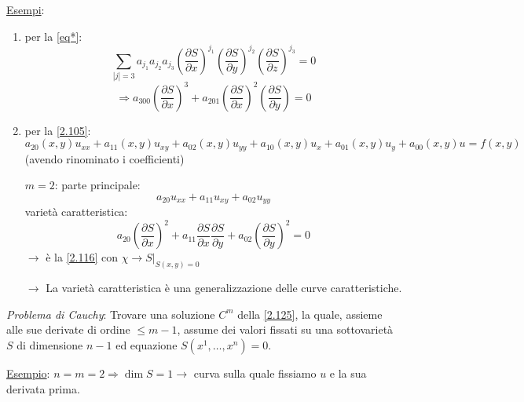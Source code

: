 \documentclass[a4paper,11pt]{report}
\begin{document}
\underline{Esempi}:
\begin{enumerate}[label=(\roman*)]
\item per la \eqref{eq*}: 
\[
\sum_{|j| = 3}a_{j_1} a_{j_2} a_{j_3}\left(\frac{\partial S}{\partial x}\right)^{j_1}\left(\frac{\partial S}{\partial y}\right)^{j_2}\left(\frac{\partial S}{\partial z}\right)^{j_3}=0
\]
\[
\Rightarrow a_{300}\left(\frac{\partial S}{\partial x}\right)^3 + a_{201}\left(\frac{\partial S}{\partial x}\right)^2\left(\frac{\partial S}{\partial y}\right)=0
\]
\item per la \eqref{2.105}:
\[
a_{20}(x,y)u_{xx}+a_{11}(x,y)u_{xy} + a_{02}(x,y)u_{yy} + a_{10}(x,y)u_x + a_{01}(x,y)u_y + a_{00}(x,y)u = f(x,y)
\]
(avendo rinominato i coefficienti)

$m=2$: parte principale:
\[
a_{20}u_{xx} + a_{11}u_{xy} + a_{02}u_{yy}
\]
variet\`a caratteristica:
\[
a_{20}\left(\frac{\partial S}{\partial x}\right)^2 + a_{11}\frac{\partial S}{\partial x}\frac{\partial S}{\partial y} + a_{02}\left(\frac{\partial S}{\partial y}\right)^2=0
\]
$\rightarrow$ \`e la \eqref{2.116} con $\chi \rightarrow S|_{S(x,y)=0}$

$\rightarrow$ La variet\`a caratteristica \`e una generalizzazione delle curve caratteristiche.
\end{enumerate}

\emph{Problema di Cauchy}: Trovare una soluzione $C^m$ della \eqref{2.125}, la quale, assieme alle sue derivate di ordine $\leq m-1$, assume dei valori fissati su una sottovariet\`a $S$ di dimensione $n-1$ ed equazione $S(x^1,\dots, x^n)=0$.

\medskip

\underline{Esempio}: $n=m=2 \Rightarrow \dim S=1 \rightarrow$ curva sulla quale fissiamo $u$ e la sua derivata prima.
\end{document}
